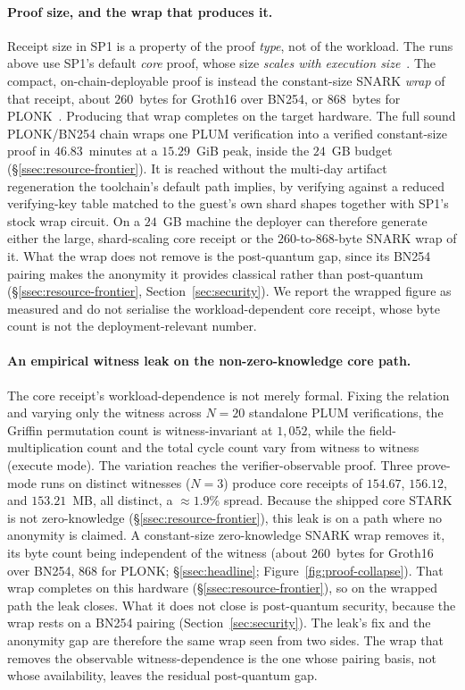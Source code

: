 \paragraph{Proof size, and the wrap that produces it.}
Receipt size in SP1 is a property of the proof \emph{type}, not of the workload. The runs above use SP1's default \emph{core} proof, whose size \emph{scales with execution size}~\cite{succinct2025prooftypes}. The compact, on-chain-deployable proof is instead the constant-size {SNARK} \emph{wrap} of that receipt, about $260$~bytes for Groth16 over {BN254}, or $868$~bytes for {PLONK}~\cite{succinct2025prooftypes}. Producing that wrap completes on the target hardware. The full sound {PLONK}/{BN254} chain wraps one PLUM verification into a verified constant-size proof in $46.83$~minutes at a $15.29$~GiB peak, inside the $24$~GB budget (\S\ref{ssec:resource-frontier}). It is reached without the multi-day artifact regeneration the toolchain's default path implies, by verifying against a reduced verifying-key table matched to the guest's own shard shapes together with SP1's stock wrap circuit. On a $24$~GB machine the deployer can therefore generate either the large, shard-scaling core receipt or the $260$-to-$868$-byte {SNARK} wrap of it. What the wrap does not remove is the post-quantum gap, since its {BN254} pairing makes the anonymity it provides classical rather than post-quantum (\S\ref{ssec:resource-frontier}, Section~\ref{sec:security}). We report the wrapped figure as measured and do not serialise the workload-dependent core receipt, whose byte count is not the deployment-relevant number.

\paragraph{An empirical witness leak on the non-zero-knowledge core path.}
The core receipt's workload-dependence is not merely formal. Fixing the relation and varying only the witness across $N=20$ standalone PLUM verifications, the Griffin permutation count is witness-invariant at $1{,}052$, while the field-multiplication count and the total cycle count vary from witness to witness (execute mode). The variation reaches the verifier-observable proof. Three prove-mode runs on distinct witnesses ($N=3$) produce core receipts of $154.67$, $156.12$, and $153.21$~MB, all distinct, a ${\approx}1.9\%$ spread. Because the shipped core STARK is not zero-knowledge (\S\ref{ssec:resource-frontier}), this leak is on a path where no anonymity is claimed. A constant-size zero-knowledge SNARK wrap removes it, its byte count being independent of the witness (about $260$~bytes for Groth16 over BN254, $868$ for PLONK; \S\ref{ssec:headline}; Figure~\ref{fig:proof-collapse}). That wrap completes on this hardware (\S\ref{ssec:resource-frontier}), so on the wrapped path the leak closes. What it does not close is post-quantum security, because the wrap rests on a {BN254} pairing (Section~\ref{sec:security}). The leak's fix and the anonymity gap are therefore the same wrap seen from two sides. The wrap that removes the observable witness-dependence is the one whose pairing basis, not whose availability, leaves the residual post-quantum gap.

